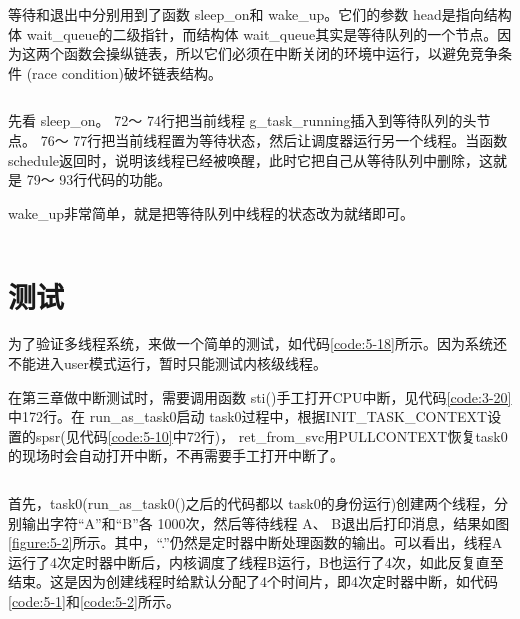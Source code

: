 \documentclass[main.tex]{subfiles}
\begin{document}
\begin{CJK*}{UTF8}{song}
等待和退出中分别用到了函数 sleep\_\-on和 wake\_\-up。它们的参数 head是指向结构体 wait\_\-queue的二级指针，而结构体 wait\_\-queue其实是等待队列的一个节点。因为这两个函数会操纵链表，所以它们必须在中断关闭的环境中运行，以避免竞争条件 (race condition)破坏链表结构。

\begin{code}
\label{code:5-16}
\inputminted[firstline=120,lastline=123,linenos,numbersep=5pt,frame=lines,framesep=2mm]{c}{src/chapter05/kernel/kernel.h}
\end{code}

先看 sleep\_\-on。 72～ 74行把当前线程 g\_\-task\_\-running插入到等待队列的头节点。 76～ 77行把当前线程置为等待状态，然后让调度器运行另一个线程。当函数 schedule返回时，说明该线程已经被唤醒，此时它把自己从等待队列中删除，这就是 79～ 93行代码的功能。

\par
 wake\_\-up非常简单，就是把等待队列中线程的状态改为就绪即可。
 
\begin{code}
\label{code:5-17}
\inputminted[firstline=63,lastline=108,linenos,numbersep=5pt,frame=lines,framesep=2mm]{c}{src/chapter05/kernel/task.c}
\end{code}

\section{测试}
为了验证多线程系统，来做一个简单的测试，如代码\ref{code:5-18}所示。因为系统还不能进入user模式运行，暂时只能测试内核级线程。

\par
在第三章做中断测试时，需要调用函数 sti()手工打开CPU中断，见代码\ref{code:3-20}中172行。在 run\_\-as\_\-task0启动 task0过程中，根据INIT\_\-TASK\_\-CONTEXT设置的spsr(见代码\ref{code:5-10}中72行)， ret\_\-from\_\-svc用PULL\-CONTEXT恢复task0的现场时会自动打开中断，不再需要手工打开中断了。

\begin{code}
\label{code:5-18}
\inputminted[firstline=501,lastline=537,linenos,numbersep=5pt,frame=lines,framesep=2mm]{c}{src/chapter05/kernel/machdep.c}
\end{code}

首先，task0(run\_\-as\_\-task0()之后的代码都以 task0的身份运行)创建两个线程，分别输出字符“A”和“B”各 1000次，然后等待线程 A、 B退出后打印消息，结果如图\ref{figure:5-2}所示。其中，“.”仍然是定时器中断处理函数的输出。可以看出，线程A运行了4次定时器中断后，内核调度了线程B运行，B也运行了4次，如此反复直至结束。这是因为创建线程时给默认分配了4个时间片，即4次定时器中断，如代码\ref{code:5-1}和\ref{code:5-2}所示。


\end{CJK*}
\end{document}
